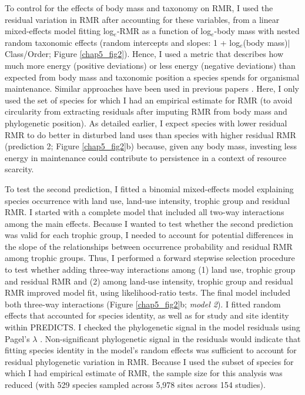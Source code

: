 To control for the effects of body mass and taxonomy on RMR, I used the residual variation in RMR after accounting for these variables, from a linear mixed-effects model fitting log$_e$-RMR as a function of log$_e$-body mass with nested random taxonomic effects (random intercepts and slopes: 1 + log$_e$(body mass)$\mid$Class/Order; Figure \ref{chap5_fig2}). Hence, I used a metric that describes how much more energy (positive deviations) or less energy (negative deviations) than expected from body mass and taxonomic position a species spends for organismal maintenance. Similar approaches have been used in previous papers \citep{Furness2008, Naya2013}. Here, I only used the set of species for which I had an empirical estimate for RMR (to avoid circularity from extracting residuals after imputing RMR from body mass and phylogenetic position). As detailed earlier, I expect species with lower residual RMR to do better in disturbed land uses than species with higher residual RMR (prediction 2; Figure \ref{chap5_fig2}b) because, given any body mass, investing less energy in maintenance could contribute to persistence in a context of resource scarcity. 

To test the second prediction, I fitted a binomial mixed-effects model explaining species occurrence with land use, land-use intensity, trophic group and residual RMR. I started with a complete model that included all two-way interactions among the main effects. Because I wanted to test whether the second prediction was valid for each trophic group, I needed to account for potential differences in the slope of the relationships between occurrence probability and residual RMR among trophic groups. Thus, I performed a forward stepwise selection procedure to test whether adding three-way interactions among (1) land use, trophic group and residual RMR and (2) among land-use intensity, trophic group and residual RMR improved model fit, using likelihood-ratio tests. The final model included both three-way interactions (Figure \ref{chap5_fig2}b; \textit{model 2}). I fitted random effects that accounted for species identity, as well as for study and site identity within PREDICTS. I checked the phylogenetic signal in the model residuals using Pagel’s $\lambda$ \citep{Pagel1999}. Non-significant phylogenetic signal in the residuals would indicate that fitting species identity in the model's random effects was sufficient to account for residual phylogenetic variation in RMR. Because I used the subset of species for which I had empirical estimate of RMR, the sample size for this analysis was reduced (with 529 species sampled across 5,978 sites across 154 studies).

